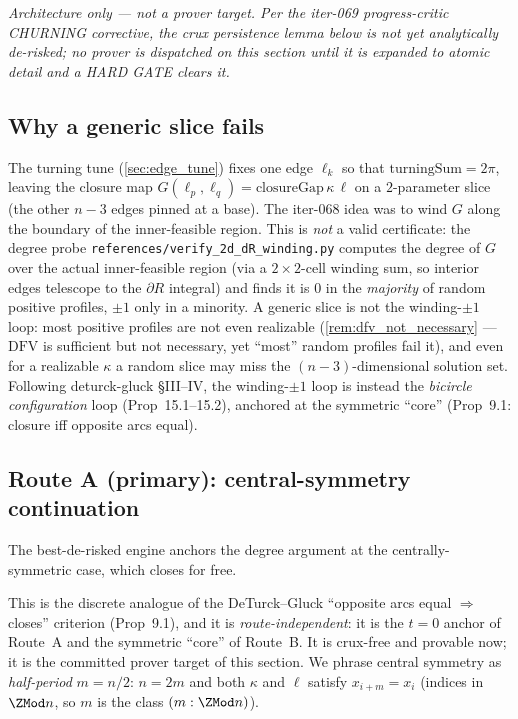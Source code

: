\emph{Architecture only --- not a prover target. Per the iter-069 progress-critic
CHURNING corrective, the crux persistence lemma below is not yet analytically
de-risked; no prover is dispatched on this section until it is expanded to atomic
detail and a HARD GATE clears it.}

\subsection*{Why a generic slice fails}

\begin{remark}
  \label{rem:generic_slice_fails}
  The turning tune (\cref{sec:edge_tune}) fixes one edge $\ell_k$ so that
  $\mathrm{turningSum} = 2\pi$, leaving the closure map
  $G(\ell_p,\ell_q) = \mathrm{closureGap}\,\kappa\,\ell$ on a $2$-parameter slice
  (the other $n-3$ edges pinned at a base). The iter-068 idea was to wind $G$
  along the boundary of the inner-feasible region. This is \emph{not} a valid
  certificate: the degree probe \texttt{references/verify\_2d\_dR\_winding.py}
  computes the degree of $G$ over the actual inner-feasible region (via a
  $2\times 2$-cell winding sum, so interior edges telescope to the $\partial R$
  integral) and finds it is $0$ in the \emph{majority} of random positive
  profiles, $\pm 1$ only in a minority. A generic slice is not the winding-$\pm 1$
  loop: most positive profiles are not even realizable
  (\cref{rem:dfv_not_necessary} --- $\mathrm{DFV}$ is sufficient but not
  necessary, yet ``most'' random profiles fail it), and even for a realizable
  $\kappa$ a random slice may miss the $(n-3)$-dimensional solution set. Following
  deturck-gluck §III--IV, the winding-$\pm 1$ loop is instead the \emph{bicircle
  configuration} loop (Prop~15.1--15.2), anchored at the symmetric ``core''
  (Prop~9.1: closure iff opposite arcs equal).
\end{remark}

\subsection*{Route A (primary): central-symmetry continuation}

The best-de-risked engine anchors the degree argument at the centrally-symmetric
case, which closes for free.

This is the discrete analogue of the DeTurck--Gluck ``opposite arcs equal
$\Rightarrow$ closes'' criterion (Prop~9.1), and it is \emph{route-independent}:
it is the $t=0$ anchor of Route~A and the symmetric ``core'' of Route~B. It is
crux-free and provable now; it is the committed prover target of this section.
We phrase central symmetry as \emph{half-period} $m = n/2$: $n = 2m$ and both
$\kappa$ and $\ell$ satisfy $x_{i+m} = x_i$ (indices in $\ZMod n$, so $m$ is the
class $(m : \ZMod n)$).

